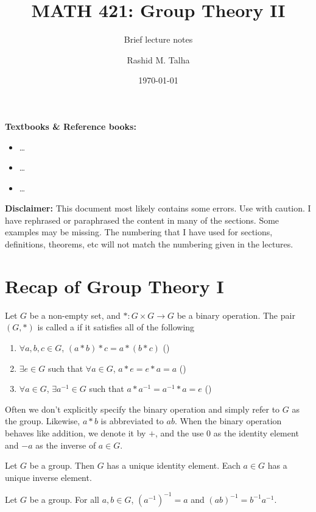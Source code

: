 \documentclass[11pt]{penrose}
\title{MATH 421: Group Theory II}
\subtitle{Brief lecture notes}
\author{Rashid M. Talha}
\affiliation{School of Natural Sciences, NUST}
\date{\today}
\begin{document}
\maketitle

\textbf{Textbooks \& Reference books:}
\begin{itemize}
    \item \dots
    \item \dots
    \item \dots
\end{itemize}

\textbf{Disclaimer:} This document most likely contains some errors. Use with caution. I have rephrased or paraphrased the content in many of the sections. Some examples may be missing. The numbering that I have used for sections, definitions, theorems, etc will not match the numbering given in the lectures.

\section{Recap of Group Theory I}
\begin{ndfn}
    Let $G$ be a non-empty set, and $* : G \times G \to G$ be a binary operation. The pair $(G, *)$ is called a  if it satisfies all of the following
    \begin{enumerate}
        \item $\forall a, b, c \in G$, $(a * b) * c = a * (b * c)$ \hfill()
        \item $\exists e \in G$ such that $\forall a \in G$, $a * e = e * a = a$ \hfill()
        \item $\forall a \in G$, $\exists a^{-1} \in G$ such that $a * a^{-1} = a^{-1} * a = e$ \hfill()
    \end{enumerate}
\end{ndfn}

Often we don't explicitly specify the binary operation and simply refer to $G$ as the group. Likewise, $a * b$ is abbreviated to $ab$. When the binary operation behaves like addition, we denote it by $+$, and the use $0$ as the identity element and $-a$ as the inverse of $a \in G$.

\begin{nthm}
    Let $G$ be a group. Then $G$ has a unique identity element. Each $a \in G$ has a unique inverse element.
\end{nthm}

\begin{nthm}
    Let $G$ be a group. For all $a, b \in G$, $(a^{-1})^{-1} = a$ and $(ab)^{-1} = b^{-1} a^{-1}$.
\end{nthm}
\end{document}
